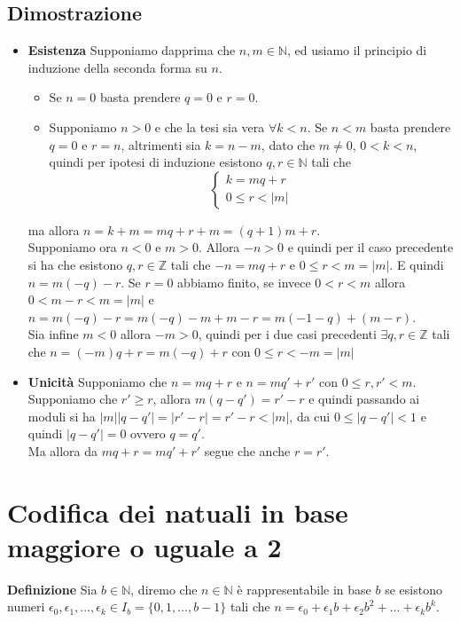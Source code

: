 \documentclass[a4paper,12pt]{article}
\begin{document}
\subsection*{Dimostrazione}
\begin{itemize}
	\item \textbf{Esistenza} Supponiamo dapprima che $n, m \in \mathbb{N}$, ed usiamo il principio di induzione della seconda forma su $n$.
		\begin{itemize}
			\item Se $n = 0$ basta prendere $q = 0$ e $r = 0$.
			\item Supponiamo $n > 0$ e che la tesi sia vera $\forall k < n$. Se $n < m$ basta prendere $q = 0$ e $r = n$, altrimenti sia $k = n - m$, dato che $m\neq 0$, $0 < k < n$, quindi per ipotesi di induzione esistono $q, r \in \mathbb{N}$ tali che
			\[ \begin{cases}
				k = mq + r \\
				0 \leq r < |m|
			\end{cases} \]
		\end{itemize}
		ma allora $n = k + m = mq + r + m = (q + 1)m + r$. \\
		Supponiamo ora $n < 0$ e $m > 0$. Allora $-n > 0$ e quindi per il caso precedente si ha che esistono $q, r \in \mathbb{Z}$ tali che $-n = mq + r$ e $0 \leq r < m = |m|$. E quindi $n = m(-q) - r$. Se $r = 0$ abbiamo finito, se invece $0 < r < m$ allora $0 < m - r < m = |m|$ e $n = m(-q) - r = m(-q) -m +m -r = m(-1 -q) + (m-r)$.\\
		Sia infine $m < 0$ allora $-m > 0$, quindi per i due casi precedenti $\exists q, r \in \mathbb{Z}$ tali che $n = (-m)q + r = m(-q) + r$ con $0 \leq r < -m = |m|$
	\item \textbf{Unicità} Supponiamo che $n = mq + r$ e $n = mq' + r'$ con $0 \leq r, r' < m$. \\
		Supponiamo che $r' \geq r$, allora $m(q - q') = r' - r$ e quindi passando ai moduli si ha $|m||q - q'| = |r' - r| = r' - r < |m|$, da cui $0 \leq |q - q'| < 1$ e quindi $|q - q'| = 0$ ovvero $q = q'$.\\
		Ma allora da $mq + r = mq' + r'$ segue che anche $r = r'$.
\end{itemize}

\clearpage

\section{Codifica dei natuali in base maggiore o uguale a 2}
\textbf{Definizione} Sia $b \in \mathbb{N}$, diremo che $n \in \mathbb{N}$ è rappresentabile in base $b$ se esistono numeri $\epsilon_{0}, \epsilon_{1}, ..., \epsilon_{k} \in I_{b} = \{0, 1, ..., b-1\}$ tali che $n = \epsilon_{0} + \epsilon_{1}b + \epsilon_{2}b^{2} + ... + \epsilon_{k}b^{k}$.
\end{document}
